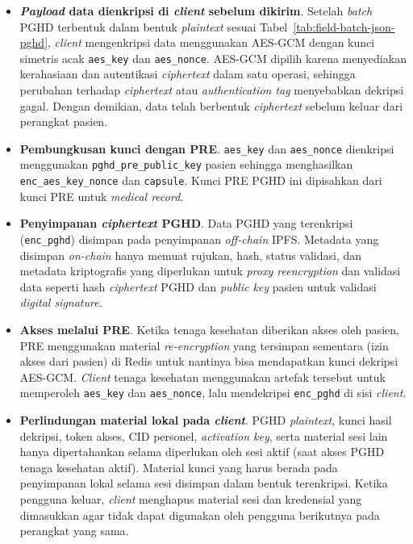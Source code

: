 \begin{itemize}
	\item \textbf{\textit{Payload} data dienkripsi di \textit{client} sebelum dikirim}.
	      Setelah \textit{batch} PGHD terbentuk dalam bentuk \textit{plaintext} sesuai Tabel~\ref{tab:field-batch-json-pghd}, \textit{client} mengenkripsi data menggunakan AES-GCM dengan kunci simetris acak \texttt{aes\_key} dan \texttt{aes\_nonce}.
	      AES-GCM dipilih karena menyediakan kerahasiaan dan autentikasi \textit{ciphertext} dalam satu operasi, sehingga perubahan terhadap \textit{ciphertext} atau \textit{authentication tag} menyebabkan dekripsi gagal.
	      Dengan demikian, data telah berbentuk \textit{ciphertext} sebelum keluar dari perangkat pasien.

	\item \textbf{Pembungkusan kunci dengan PRE}.
	      \texttt{aes\_key} dan \texttt{aes\_nonce} dienkripsi menggunakan \texttt{pghd\_pre\_public\_key} pasien sehingga menghasilkan \texttt{enc\_aes\_key\_nonce} dan \texttt{capsule}.
	      Kunci PRE PGHD ini dipisahkan dari kunci PRE untuk \textit{medical record}.

	\item \textbf{Penyimpanan \textit{ciphertext} PGHD}.
	      Data PGHD yang terenkripsi (\texttt{enc\_pghd}) disimpan pada penyimpanan \textit{off-chain} IPFS\@.
	      Metadata yang disimpan \textit{on-chain} hanya memuat rujukan, hash, status validasi, dan metadata kriptografis yang diperlukan untuk \textit{proxy reencryption} dan validasi data seperti hash \textit{ciphertext} PGHD dan \textit{public key} pasien untuk validasi \textit{digital signature}.

	\item \textbf{Akses melalui PRE}.
	      Ketika tenaga kesehatan diberikan akses oleh pasien, PRE menggunakan material \textit{re-encryption} yang tersimpan sementara (izin akses dari pasien) di Redis untuk nantinya bisa mendapatkan kunci dekripsi AES-GCM\@.
	      \textit{Client} tenaga kesehatan menggunakan artefak tersebut untuk memperoleh \texttt{aes\_key} dan \texttt{aes\_nonce}, lalu mendekripsi \texttt{enc\_pghd} di sisi \textit{client}.

	\item \textbf{Perlindungan material lokal pada \textit{client}}.
	      PGHD \textit{plaintext}, kunci hasil dekripsi, token akses, CID personel, \textit{activation key}, serta material sesi lain hanya dipertahankan selama diperlukan oleh sesi aktif (saat akses PGHD tenaga kesehatan aktif).
	      Material kunci yang harus berada pada penyimpanan lokal selama sesi disimpan dalam bentuk terenkripsi.
	      Ketika pengguna keluar, \textit{client} menghapus material sesi dan kredensial yang dimasukkan agar tidak dapat digunakan oleh pengguna berikutnya pada perangkat yang sama.


\end{itemize}
